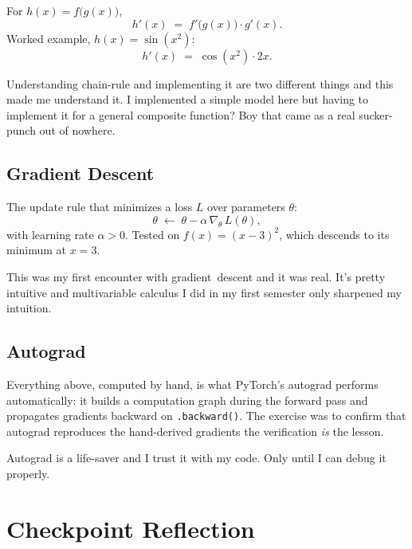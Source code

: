 \documentclass[11pt,a4paper]{article}
\begin{document}
For $h(x) = f\bigl(g(x)\bigr)$,
\[
  h'(x) \;=\; f'\!\bigl(g(x)\bigr)\cdot g'(x).
\]
Worked example, $h(x) = \sin(x^{2})$:
\[
  h'(x) \;=\; \cos(x^{2})\cdot 2x.
\]

Understanding chain-rule and implementing it are two different things and this made me understand it. I implemented a simple model here but having to implement it for a general composite function? Boy that came as a real sucker-punch out of nowhere.

\subsection{Gradient Descent}
\label{subsec:gradient-descent}

The update rule that minimizes a loss $L$ over parameters $\theta$:
\[
  \theta \;\leftarrow\; \theta - \alpha\,\nabla_{\!\theta}\, L(\theta),
\]
with learning rate $\alpha > 0$.
Tested on $f(x) = (x-3)^{2}$, which descends to its minimum at $x = 3$.

This was my first encounter with gradient~descent and it was real. It's pretty intuitive and multivariable calculus I did in my first semester only sharpened my intuition.

\subsection{Autograd}
\label{subsec:autograd}

Everything above, computed by hand, is what PyTorch's autograd performs
automatically: it builds a computation graph during the forward pass and
propagates gradients backward on \texttt{.backward()}.
The exercise was to confirm that autograd reproduces the hand-derived
gradients \textemdash{} the verification \emph{is} the lesson.

Autograd is a life-saver and I trust it with my code. Only until I can debug it properly.

\section{Checkpoint Reflection}
\label{sec:checkpoint}
\end{document}

